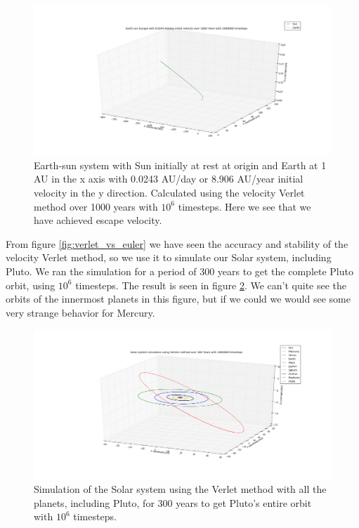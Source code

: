 \documentclass[a4paper,11pt]{article}
\begin{document}
{\begin{figure}[H]
	\centering
	\includegraphics[scale=0.35]{figure_8}
	\caption{Earth-sun system with Sun initially at rest at origin and Earth at 1 AU in the x axis with 0.0243 AU/day or 8.906 AU/year initial velocity in the y direction. Calculated using the velocity Verlet method over 1000 years with $10^{6}$ timesteps. Here we see that we have achieved escape velocity.}
	\label{fig:E_S_escape3}
\end{figure}


From figure \ref{fig:verlet_vs_euler} we have seen the accuracy and stability of the velocity Verlet method, so we use it to simulate our Solar system, including Pluto. We ran the simulation for a period of 300 years to get the complete Pluto orbit, using $10^{6}$ timesteps. The result is seen in figure \ref{fig:solar_system}. We can't quite see the orbits of the innermost planets in this figure, but if we could we would see some very strange behavior for Mercury.



\begin{figure}[H]
	\centering
	\includegraphics[scale=0.35]{figure_1}
	\caption{Simulation of the Solar system using the Verlet method with all the planets, including Pluto, for 300 years to get Pluto's entire orbit with $10^{6}$ timesteps.}
	\label{fig:solar_system}
\end{figure}

}
\end{document}
